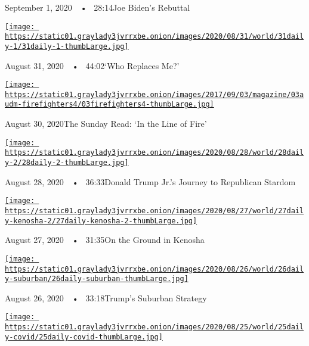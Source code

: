 September 1, 2020~~•~ 28:14Joe Biden's Rebuttal

\href{https://www.nytimes3xbfgragh.onion/2020/08/31/podcasts/the-daily/flint-michigan-police-officer.html?action=click\&module=audio-series-bar\&region=header\&pgtype=Article}{\texttt{[image: https://static01.graylady3jvrrxbe.onion/images/2020/08/31/world/31daily-1/31daily-1-thumbLarge.jpg]}}

August 31, 2020~~•~ 44:02`Who Replaces Me?'

\href{https://www.nytimes3xbfgragh.onion/2020/08/30/podcasts/the-daily/california-wildfires-prisoners.html?action=click\&module=audio-series-bar\&region=header\&pgtype=Article}{\texttt{[image: https://static01.graylady3jvrrxbe.onion/images/2017/09/03/magazine/03audm-firefighters4/03firefighters4-thumbLarge.jpg]}}

August 30, 2020The Sunday Read: `In the Line of Fire'

\href{https://www.nytimes3xbfgragh.onion/2020/08/28/podcasts/the-daily/donald-trump-junior-campaign.html?action=click\&module=audio-series-bar\&region=header\&pgtype=Article}{\texttt{[image: https://static01.graylady3jvrrxbe.onion/images/2020/08/28/world/28daily-2/28daily-2-thumbLarge.jpg]}}

August 28, 2020~~•~ 36:33Donald Trump Jr.'s Journey to Republican
Stardom

\href{https://www.nytimes3xbfgragh.onion/2020/08/27/podcasts/the-daily/kenosha-wisconsin-protests.html?action=click\&module=audio-series-bar\&region=header\&pgtype=Article}{\texttt{[image: https://static01.graylady3jvrrxbe.onion/images/2020/08/27/world/27daily-kenosha-2/27daily-kenosha-2-thumbLarge.jpg]}}

August 27, 2020~~•~ 31:35On the Ground in Kenosha

\href{https://www.nytimes3xbfgragh.onion/2020/08/26/podcasts/the-daily/republican-convention-suburbs.html?action=click\&module=audio-series-bar\&region=header\&pgtype=Article}{\texttt{[image: https://static01.graylady3jvrrxbe.onion/images/2020/08/26/world/26daily-suburban/26daily-suburban-thumbLarge.jpg]}}

August 26, 2020~~•~ 33:18Trump's Suburban Strategy

\href{https://www.nytimes3xbfgragh.onion/2020/08/25/podcasts/the-daily/coronavirus-plasma-reinfection.html?action=click\&module=audio-series-bar\&region=header\&pgtype=Article}{\texttt{[image: https://static01.graylady3jvrrxbe.onion/images/2020/08/25/world/25daily-covid/25daily-covid-thumbLarge.jpg]}}

